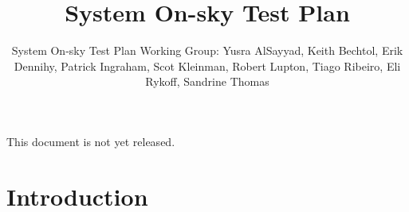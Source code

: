 \documentclass[SE,authoryear,toc,lsstdraft]{lsstdoc}
\title{System On-sky Test Plan}
\author{%
System On-sky Test Plan Working Group: Yusra AlSayyad, Keith Bechtol, Erik Dennihy, Patrick Ingraham, Scot Kleinman, Robert Lupton, Tiago Ribeiro, Eli Rykoff, Sandrine Thomas
}
\date{\vcsDate}
\begin{document}
\maketitle


\begin{warning}
  This document is not yet released.
\end{warning}

\section{Introduction}







\end{document}
